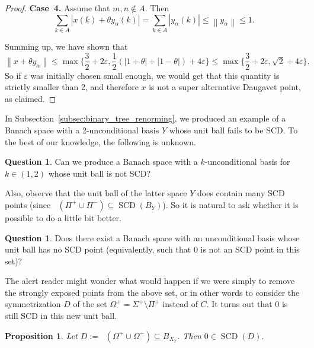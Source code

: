 \documentclass[11pt,a4paper,reqno]{amsart}
\numberwithin{equation}{section}
\newcommand{\abs}[1]{\left\lvert#1\right\rvert}
\newcommand{\norm}[1]{\left\lVert#1\right\rVert}
\newcommand{\eps}{\varepsilon}
\DeclareMathOperator{\cconv}{\overline{conv}}
\DeclareMathOperator{\SCD}{SCD}
\newcommand{\1}{\mathbbm{1}}
\renewcommand{\leq}{\leqslant}
\theoremstyle{plain}
\newtheorem{proposition}[theorem]{Proposition}
\theoremstyle{definition}
\newtheorem{question}[theorem]{Question}
\begin{document}
\begin{proof}
    \textbf{Case~4.} Assume that $m,n\notin A$. Then \begin{equation*}
        \sum_{k\in A}\abs{x(k)+\theta y_\alpha(k)}=\sum_{k\in A}\abs{y_\alpha(k)}\leq \norm{y_\alpha}\leq 1.
    \end{equation*}

    Summing up, we have shown that \begin{equation*}
        \norm{x+\theta y_\alpha}\leq \max\{\frac{3}{2}+2\eps,\frac{1}{2}(\abs{1+\theta}+\abs{1-\theta})+4\eps\}\leq \max\{\frac{3}{2}+2\eps,\sqrt{2}+4\eps\}.
    \end{equation*} So if $\eps$ was initially chosen small enough, we would get that this quantity is strictly smaller than 2, and therefore $x$ is not a super alternative Daugavet point, as claimed. 
\end{proof}

In Subsection~\ref{subsec:binary_tree_renorming}, we produced an example of a Banach space with a 2-unconditional basis $Y$ whose unit ball fails to be SCD. To the best of our knowledge, the following is unknown. 

\begin{question}
    Can we produce a Banach space with a $k$-unconditional basis for $k\in(1,2)$ whose unit ball is not SCD?
\end{question}

Also, observe that the unit ball of the latter space $Y$ does contain many SCD points (since $\cconv(\Pi^+\cup\Pi^-)\subseteq \SCD(B_Y)$). So it is natural to ask whether it is possible to do a little bit better. 

\begin{question}
    Does there exist a Banach space with an unconditional basis whose unit ball has no SCD point (equivalently, such that 0 is not an SCD point in this set)? 
\end{question}

The alert reader might wonder what would happen if we were simply to remove the strongly exposed points from the above set, or in other words to consider the symmetrization $D$ of the set $\Omega^+=\Sigma^+\setminus \Pi^+$ instead of $C$. It turns out that 0 is still SCD in this new unit ball. 

\begin{proposition}
    Let $D:=\cconv(\Omega^+\cup\Omega^-)\subseteq B_{X_T}$. Then $0\in\SCD(D)$. 

\end{proposition}
  
\end{document}
